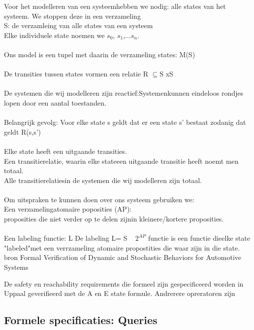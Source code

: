 Voor het modelleren van een systeemhebben we nodig:
\newline
alle states van het systeem.
\newline
We stoppen deze in een verzameling \\
S: de verzamleing van alle states van een systeem\\
Elke individuele state noemen we $s_{0}$, $s_{1}$,...$s_{n}$.\\
\\
Ons   model   is   een   tupel   met   daarin   de   verzameling   states: M(S)\\
\\
De transities tussen states vormen een relatie
R $\subseteq$S xS\\
\\
De systemen die wij modelleren zijn reactief:Systemenkunnen eindeloos rondjes lopen door een aantal toestanden. \\
\\
Belangrijk gevolg: Voor elke state s \inS geldt dat er een state s' bestaat zodanig dat geldt R(s,s') \\
\\
Elke state heeft een uitgaande transities.
\\
Een transitierelatie, waarin elke stateeen uitgaande transitie heeft noemt men totaal. \\
Alle transitierelatiesin de  systemen die wij modelleren zijn totaal.
\\
\\
Om uitspraken te kunnen doen over ons systeem gebruiken we: \\
Een verzamelingatomaire poposities (AP):\\
proposities die niet verder op te delen zijnin kleinere/kortere proposities. \\
\\
Een labeling functie: L
De labeling  L= S \to   ~ $2^{AP}$ functie is een functie dieelke state "labeled"met een verrzameling atomaire propostities die waar zijn in die state.
\\
bron Formal Verification of Dynamic and Stochastic Behaviors for Automotive Systems


De safety en reachability requirements die formeel zijn gespecificeerd worden in Uppaal geverifieerd met de A en E state formule. Andrerere opreratoren zijn





\subsection{Formele specificaties: Queries}




